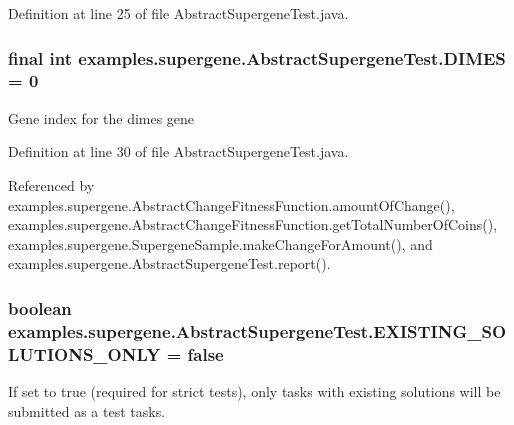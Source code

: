 Definition at line 25 of file Abstract\-Supergene\-Test.\-java.

\hypertarget{classexamples_1_1supergene_1_1_abstract_supergene_test_a2581251d3607aad43d8b2815b8202c8e}{
\subsubsection[{D\-I\-M\-E\-S}]{\setlength{\rightskip}{0pt plus 5cm}final int examples.\-supergene.\-Abstract\-Supergene\-Test.\-D\-I\-M\-E\-S = 0\hspace{0.3cm}{\ttfamily [static]}}}\label{classexamples_1_1supergene_1_1_abstract_supergene_test_a2581251d3607aad43d8b2815b8202c8e}
Gene index for the dimes gene 

Definition at line 30 of file Abstract\-Supergene\-Test.\-java.



Referenced by examples.\-supergene.\-Abstract\-Change\-Fitness\-Function.\-amount\-Of\-Change(), examples.\-supergene.\-Abstract\-Change\-Fitness\-Function.\-get\-Total\-Number\-Of\-Coins(), examples.\-supergene.\-Supergene\-Sample.\-make\-Change\-For\-Amount(), and examples.\-supergene.\-Abstract\-Supergene\-Test.\-report().

\hypertarget{classexamples_1_1supergene_1_1_abstract_supergene_test_afa2af2b745985502119958481e9c12f6}{
\subsubsection[{E\-X\-I\-S\-T\-I\-N\-G\-\_\-\-S\-O\-L\-U\-T\-I\-O\-N\-S\-\_\-\-O\-N\-L\-Y}]{\setlength{\rightskip}{0pt plus 5cm}boolean examples.\-supergene.\-Abstract\-Supergene\-Test.\-E\-X\-I\-S\-T\-I\-N\-G\-\_\-\-S\-O\-L\-U\-T\-I\-O\-N\-S\-\_\-\-O\-N\-L\-Y = false\hspace{0.3cm}{\ttfamily [static]}}}\label{classexamples_1_1supergene_1_1_abstract_supergene_test_afa2af2b745985502119958481e9c12f6}
If set to true (required for strict tests), only tasks with existing solutions will be submitted as a test tasks. 

